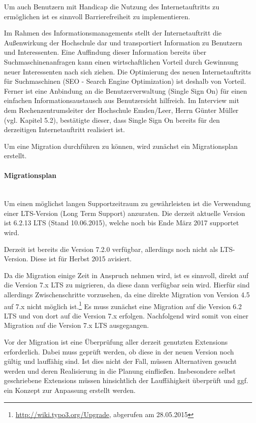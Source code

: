 Um auch Benutzern mit Handicap die Nutzung des Internetauftritts zu ermöglichen ist es sinnvoll Barrierefreiheit zu implementieren. 

Im Rahmen des Informationsmanagements stellt der Internetauftritt die Außenwirkung der Hochschule dar und transportiert Information zu Benutzern und Interessenten. Eine Auffindung dieser Information bereits über Suchmaschinenanfragen kann einen wirtschaftlichen Vorteil durch Gewinnung neuer Interessenten nach sich ziehen. Die Optimierung des neuen Internetauftritts für Suchmaschinen (SEO - Search Engine Optimization) ist deshalb von Vorteil. Ferner ist eine Anbindung an die Benutzerverwaltung (Single Sign On) für einen einfachen Informationsaustausch aus Benutzersicht hilfreich. Im Interview mit dem Rechenzentrumsleiter der Hochschule Emden/Leer, Herrn Günter Müller (vgl. Kapitel 5.2), bestätigte dieser, dass Single Sign On bereits für den derzeitigen Internetauftritt realisiert ist. 

Um eine Migration durchführen zu können, wird zunächst ein Migrationsplan erstellt.

\paragraph{Migrationsplan}\mbox{}\\
Um einen möglichst langen Supportzeitraum zu gewährleisten ist die Verwendung einer LTS-Version (Long Term Support) anzuraten. Die derzeit aktuelle Version ist 6.2.13 LTS (Stand 10.06.2015), welche noch bis Ende März 2017 supportet wird.

Derzeit ist bereits die Version 7.2.0 verfügbar, allerdings noch nicht als LTS-Version. Diese ist für Herbst 2015 avisiert. 

Da die Migration einige Zeit in Anspruch nehmen wird, ist es sinnvoll, direkt auf die Version 7.x LTS zu migrieren, da diese dann verfügbar sein wird. Hierfür sind allerdings Zwischenschritte vorzusehen, da eine direkte Migration von Version 4.5 auf 7.x nicht möglich ist.\footnote{\url{http://wiki.typo3.org/Upgrade}, abgerufen am 28.05.2015} Es muss zunächst eine Migration auf die Version 6.2 LTS und von dort auf die Version 7.x erfolgen. Nachfolgend wird somit von einer Migration auf die Version 7.x LTS ausgegangen.

Vor der Migration ist eine Überprüfung aller derzeit genutzten Extensions erforderlich. Dabei muss geprüft werden, ob diese in der neuen Version noch gültig und lauffähig sind. Ist dies nicht der Fall, müssen Alternativen gesucht werden und deren Realisierung in die Planung einfließen. Insbesondere selbst geschriebene Extensions müssen hinsichtlich der Lauffähigkeit überprüft und ggf. ein Konzept zur Anpassung erstellt werden.

